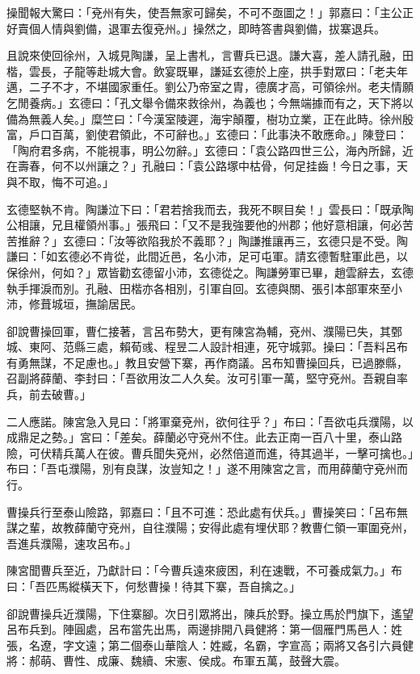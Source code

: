 操聞報大驚曰：「兗州有失，使吾無家可歸矣，不可不亟圖之！」郭嘉曰：「主公正好賣個人情與劉備，退軍去復兗州。」操然之，即時答書與劉備，拔寨退兵。

且說來使回徐州，入城見陶謙，呈上書札，言曹兵已退。謙大喜，差人請孔融，田楷，雲長，子龍等赴城大會。飲宴既畢，謙延玄德於上座，拱手對眾曰：「老夫年邁，二子不才，不堪國家重任。劉公乃帝室之胄，德廣才高，可領徐州。老夫情願乞閒養病。」玄德曰：「孔文舉令備來救徐州，為義也；今無端據而有之，天下將以備為無義人矣。」糜竺曰：「今漢室陵遲，海宇顛覆，樹功立業，正在此時。徐州殷富，戶口百萬，劉使君領此，不可辭也。」玄德曰：「此事決不敢應命。」陳登曰：「陶府君多病，不能視事，明公勿辭。」玄德曰：「袁公路四世三公，海內所歸，近在壽春，何不以州讓之？」孔融曰：「袁公路塚中枯骨，何足挂齒！今日之事，天與不取，悔不可追。」

玄德堅執不肯。陶謙泣下曰：「君若捨我而去，我死不瞑目矣！」雲長曰：「既承陶公相讓，兄且權領州事。」張飛曰：「又不是我強要他的州郡；他好意相讓，何必苦苦推辭？」玄德曰：「汝等欲陷我於不義耶？」陶謙推讓再三，玄德只是不受。陶謙曰：「如玄德必不肯從，此間近邑，名小沛，足可屯軍。請玄德暫駐軍此邑，以保徐州，何如？」眾皆勸玄德留小沛，玄德從之。陶謙勞軍已畢，趙雲辭去，玄德執手揮淚而別。孔融、田楷亦各相別，引軍自回。玄德與關、張引本部軍來至小沛，修葺城垣，撫諭居民。

卻說曹操回軍，曹仁接著，言呂布勢大，更有陳宮為輔，兗州、濮陽已失，其鄄城、東阿、范縣三處，賴荀彧、程昱二人設計相連，死守城郭。操曰：「吾料呂布有勇無謀，不足慮也。」教且安營下寨，再作商議。呂布知曹操回兵，已過滕縣，召副將薛蘭、李封曰：「吾欲用汝二人久矣。汝可引軍一萬，堅守兗州。吾親自率兵，前去破曹。」

二人應諾。陳宮急入見曰：「將軍棄兗州，欲何往乎？」布曰：「吾欲屯兵濮陽，以成鼎足之勢。」宮曰：「差矣。薛蘭必守兗州不住。此去正南一百八十里，泰山路險，可伏精兵萬人在彼。曹兵聞失兗州，必然倍道而進，待其過半，一擊可擒也。」布曰：「吾屯濮陽，別有良謀，汝豈知之！」遂不用陳宮之言，而用薛蘭守兗州而行。

曹操兵行至泰山險路，郭嘉曰：「且不可進：恐此處有伏兵。」曹操笑曰：「呂布無謀之輩，故教薛蘭守兗州，自往濮陽；安得此處有埋伏耶？教曹仁領一軍圍兗州，吾進兵濮陽，速攻呂布。」

陳宮聞曹兵至近，乃獻計曰：「今曹兵遠來疲困，利在速戰，不可養成氣力。」布曰：「吾匹馬縱橫天下，何愁曹操！待其下寨，吾自擒之。」

卻說曹操兵近濮陽，下住寨腳。次日引眾將出，陳兵於野。操立馬於門旗下，遙望呂布兵到。陣圓處，呂布當先出馬，兩邊排開八員健將：第一個雁門馬邑人：姓張，名遼，字文遠；第二個泰山華陰人：姓臧，名霸，字宣高；兩將又各引六員健將：郝萌、曹性、成廉、魏續、宋憲、侯成。布軍五萬，鼓聲大震。

